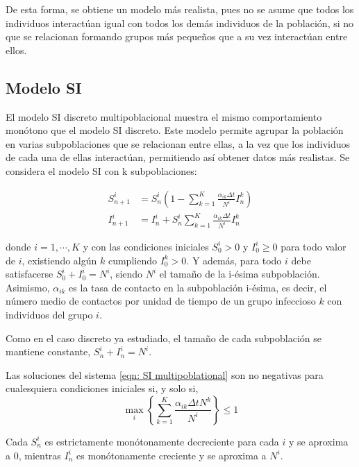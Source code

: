 De esta forma, se obtiene un modelo más realista, pues no se asume que todos los individuos interactúan igual con todos los demás individuos de la población, si no que se relacionan formando grupos más pequeños que a su vez interactúan entre ellos.

\subsection{Modelo SI}

El modelo SI discreto multipoblacional muestra el mismo comportamiento monótono que el modelo SI discreto. Este modelo permite agrupar la población en varias subpoblaciones que se relacionan entre ellas, a la vez que los individuos de cada una de ellas interactúan, permitiendo así obtener datos más realistas. Se considera el modelo SI con k subpoblaciones:

\begin{equation}
\label{eqn: SI multipoblational}
\begin{aligned}
S_{n+1}^i &= S_n^i \left( 1- \sum_{k=1}^{K} \frac{\alpha_{ik}\Delta t}{N^i}I_n^k \right) \\
I_{n+1}^i &= I_n^i + S_n^i \sum_{k=1}^{K} \frac{\alpha_{ik}\Delta t}{N^i}I_n^k
\end {aligned}
\end{equation}

donde $i=1, \cdots , K$ y con las condiciones iniciales $S_0^i > 0$ y $I_0^i\geq 0$ para todo valor de $i$, existiendo algún $k$ cumpliendo $I_0^k>0$. Y además, para todo $i$ debe satisfacerse $S_0^i+I_0^i=N^i$, siendo $N^i$ el tamaño de la i-ésima subpoblación. Asimismo, $\alpha_{ik}$ es la tasa de contacto en la subpoblación i-ésima, es decir, el número medio de contactos por unidad de tiempo de un grupo infeccioso $k$ con individuos del grupo $i$.

Como en el caso discreto ya estudiado, el tamaño de cada subpoblación se mantiene constante, $S_n^i+I_n^i=N^i$.

\begin{proposition}
Las soluciones del sistema \eqref{eqn: SI multipoblational} son no negativas para cualesquiera condiciones iniciales si, y solo si,
$$\max_i \left\{ \sum_{k=1}^{K} \frac{\alpha_{ik}\Delta t N^k}{N^i} \right\} \leq 1$$
\end{proposition}

\begin{proposition}
Cada $S_n^i$ es estrictamente monótonamente decreciente para cada $i$ y se aproxima a $0$, mientras $I_n^i$ es monótonamente creciente y se aproxima a $N^i$. 
\end{proposition}



